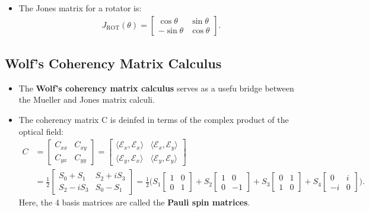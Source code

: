 \documentclass[10pt]{article}
\begin{document}
\begin{itemize}
		\item The Jones matrix for a rotator is:
		\begin{align*}
			J_{\mathrm{ROT}}(\theta) = \begin{bmatrix}
				\cos \theta & \sin \theta \\
				-\sin \theta & \cos \theta
			\end{bmatrix}.
		\end{align*}
	\end{itemize}

	\subsection{Wolf's Coherency Matrix Calculus}

	\begin{itemize}
		\item The \textbf{Wolf's coherency matrix calculus} serves as a usefu bridge between the Mueller and Jones matrix calculi.

		\item The coherency matrix C is deinfed in terms of the complex product of the optical field:
		\begin{align*}
			C &= \begin{bmatrix}
				C_{xx} & C_{xy} \\
				C_{yx} & C_{yy}
			\end{bmatrix}
			= \begin{bmatrix}
				\langle \mathcal{E}_x, \mathcal{E}_x \rangle & \langle \mathcal{E}_x, \mathcal{E}_y \rangle \\
				\langle \mathcal{E}_y, \mathcal{E}_x \rangle & \langle \mathcal{E}_y, \mathcal{E}_y \rangle
			\end{bmatrix} \\			
			&= \frac{1}{2} \begin{bmatrix}
				S_0 + S_1 & S_2 + iS_3 \\
				S_2 - iS_3 & S_0 - S_1
			\end{bmatrix} 
		 	= \frac{1}{2} \bigg( 
		 		S_1 \begin{bmatrix}
		 			1 & 0 \\ 0 & 1
		 		\end{bmatrix}
		 		+ S_2 \begin{bmatrix}
		 			1 & 0 \\ 0 & -1
		 		\end{bmatrix}
		 		+ S_3 \begin{bmatrix}
		 			0 & 1 \\ 1 & 0
		 		\end{bmatrix}
		 		+ S_4 \begin{bmatrix}
		 			0 & i \\ -i & 0
		 		\end{bmatrix}
		 	\bigg).
		\end{align*}
		Here, the 4 basis matrices are called the \textbf{Pauli spin matrices}.


\end{itemize}
\end{document}
